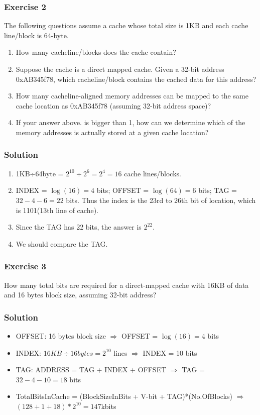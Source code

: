 \documentclass{article}
\begin{document}
\subsubsection*{Exercise 2}
The following questions assume a cache whose total size is 1KB and each cache line/block is 64-byte. 
\begin{enumerate}
    \item How many cacheline/blocks does the cache contain?
    \item Suppose the cache is a direct mapped cache. Given a 32-bit address 0xAB345f78, which cacheline/block contains the cached data for this address?
    \item How many cacheline-aligned memory addresses can be mapped to the same cache location as 0xAB345f78 (assuming 32-bit address space)?
    \item If your answer above. is bigger than 1, how can we determine which of the memory addresses is actually stored at a given cache location?
\end{enumerate}

\subsubsection*{Solution}
\begin{enumerate}
    \item 1KB$\div$64byte = $2^{10} \div 2^6 = 2^4 = 16$ cache lines/blocks.
    \item INDEX = $\log(16) = 4$ bits; OFFSET = $\log(64) = 6$ bits; TAG = $32-4-6=22$ bits. Thus the index is the 23rd to 26th bit of location, which is 1101(13th line of cache).
    \item Since the TAG has 22 bits, the answer is $2^{22}$.
    \item We should compare the TAG.
\end{enumerate}

\subsubsection*{Exercise 3}
How many total bits are required for a direct-mapped cache with 16KB of data and 16 bytes block size, assuming 32-bit address?

\subsubsection*{Solution}
\begin{itemize}
    \item OFFSET: 16 bytes block size $\Rightarrow$ OFFSET = $\log(16) = 4$ bits
    \item INDEX: $16KB \div 16bytes = 2^{10}$ lines $\Rightarrow$ INDEX = 10 bits
    \item TAG: ADDRESS = TAG + INDEX + OFFSET $\Rightarrow$ TAG = $32-4-10 = 18$ bits
    \item TotalBitsInCache = (BlockSizeInBits + V-bit + TAG)*(No.OfBlocks) $\Rightarrow$ $(128+1+18)*2^{10} = 147$kbits
\end{itemize}
\end{document}

